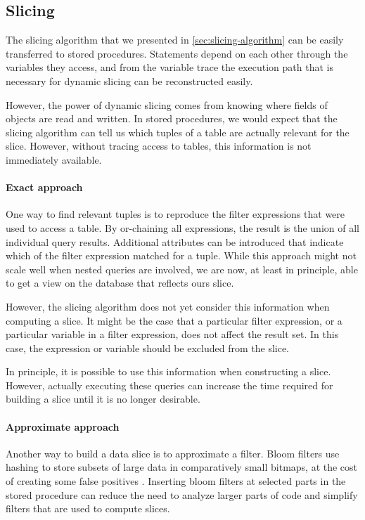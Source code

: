 \documentclass[english]{scrartcl}
\begin{document}
\subsection{Slicing}

The slicing algorithm that we presented in \cref{sec:slicing-algorithm} can be easily transferred to stored procedures.
Statements depend on each other through the variables they access, and from the variable trace the execution path that is necessary for dynamic slicing can be reconstructed easily.

However, the power of dynamic slicing comes from knowing where fields of objects are read and written.
In stored procedures, we would expect that the slicing algorithm can tell us which tuples of a table are actually relevant for the slice.
However, without tracing access to tables, this information is not immediately available.

\paragraph{Exact approach}

One way to find relevant tuples is to reproduce the filter expressions that were used to access a table.
By or-chaining all expressions, the result is the union of all individual query results.
Additional attributes can be introduced that indicate which of the filter expression matched for a tuple.
While this approach might not scale well when nested queries are involved, we are now, at least in principle, able to get a view on the database that reflects ours slice.

However, the slicing algorithm does not yet consider this information when computing a slice.
It might be the case that a particular filter expression, or a particular variable in a filter expression, does not affect the result set.
In this case, the expression or variable should be excluded from the slice.

In principle, it is possible to use this information when constructing a slice.
However, actually executing these queries can increase the time required for building a slice until it is no longer desirable. 

\paragraph{Approximate approach}

Another way to build a data slice is to approximate a filter.
Bloom filters use hashing to store subsets of large data in comparatively small bitmaps, at the cost of creating some false positives \cite{Pagh:2005:OBF:1070432.1070548}.
Inserting bloom filters at selected parts in the stored procedure can reduce the need to analyze larger parts of code and simplify filters that are used to compute slices.
\end{document}
